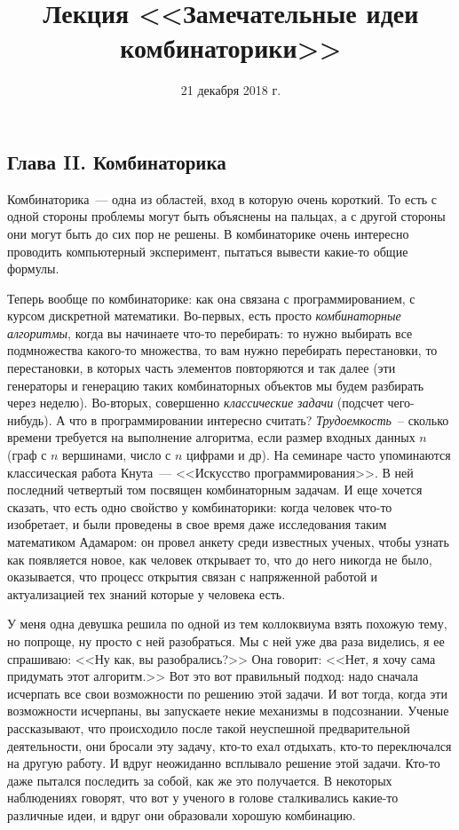 \documentclass[russian]{lecture-notes}
\title{Лекция <<Замечательные идеи комбинаторики>>}
\date{21 декабря 2018 г.}
\theoremstyle{definition}
\begin{document}
	\maketitle
	
	\begin{center}
		\section*{\LARGE Глава II. Комбинаторика}
		\label{glav:komb}
	\end{center}

	Комбинаторика~--- одна из областей, вход в которую очень короткий. То есть с одной стороны проблемы могут быть объяснены на пальцах, а с другой стороны они могут быть до сих пор не решены. В комбинаторике очень интересно проводить компьютерный эксперимент, пытаться вывести какие-то общие формулы.
	
	Теперь вообще по комбинаторике: как она связана с программированием, с курсом дискретной математики. Во-первых, есть просто \emph{комбинаторные алгоритмы}, когда вы начинаете что-то перебирать: то нужно выбирать все подмножества какого-то множества, то вам нужно перебирать перестановки, то перестановки, в которых часть элементов повторяются и так далее (эти генераторы и генерацию таких комбинаторных объектов мы будем разбирать через неделю). Во-вторых, совершенно \emph{классические задачи} (подсчет чего-нибудь). А что в программировании интересно считать? \emph{Трудоемкость}~-- сколько времени требуется на выполнение алгоритма, если размер входных данных $n$ (граф с $n$ вершинами, число с $n$ цифрами и др). На семинаре часто упоминаются классическая работа Кнута~--- <<Искусство программирования>>. В ней последний четвертый том посвящен комбинаторным задачам. И еще хочется сказать, что есть одно свойство у комбинаторики: когда человек что-то изобретает, и были проведены в свое время даже исследования таким математиком Адамаром: он провел анкету среди известных ученых, чтобы узнать как появляется новое, как человек открывает то, что до него никогда не было, оказывается, что процесс открытия связан с напряженной работой и актуализацией тех знаний которые у человека есть.
	
	У меня одна девушка решила по одной из тем коллоквиума взять похожую тему, но попроще, ну просто с ней разобраться. Мы с ней уже два раза виделись, я ее спрашиваю: <<Ну как, вы разобрались?>> Она говорит: <<Нет, я хочу сама придумать этот алгоритм.>> Вот это вот правильный подход: надо сначала исчерпать все свои возможности по решению этой задачи. И вот тогда, когда эти возможности исчерпаны, вы запускаете некие механизмы в подсознании. Ученые рассказывают, что происходило после такой неуспешной предварительной деятельности, они бросали эту задачу, кто-то ехал отдыхать, кто-то переключался на другую работу. И вдруг неожиданно всплывало решение этой задачи. Кто-то даже пытался последить за собой, как же это получается. В некоторых наблюдениях говорят, что вот у ученого в голове сталкивались какие-то различные идеи, и вдруг они образовали хорошую комбинацию. 
	
\end{document}
